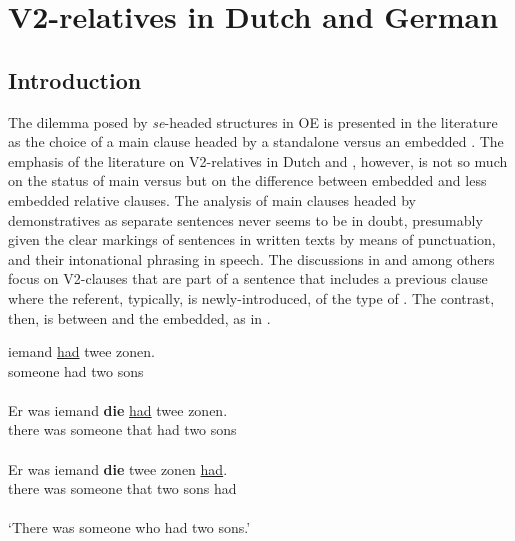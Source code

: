 \documentclass[output=paper,colorlinks,citecolor=brown]{langscibook}
\begin{document}
\section{V2-relatives in Dutch and German}\label{sec:los:3}

\subsection{Introduction}\label{sec:los:3.1}
The dilemma posed by \textit{se}-headed structures in OE is presented in the literature as the choice of a main clause headed by a standalone  versus an embedded . The emphasis of the literature on V2-relatives in Dutch and , however, is not so much on the status of main versus  but on the difference between embedded and less embedded relative clauses. The analysis of main clauses headed by demonstratives as separate sentences never seems to be in doubt, presumably given the clear markings of sentences in written texts by means of punctuation, and their intonational phrasing in speech. The discussions in \citet{Gärtner2001} and \citet{Zwart2003} among others focus on V2-clauses that are part of a sentence that includes a previous clause where the referent, typically, is newly-introduced, of the type of . The contrast, then, is between  and the embedded,   as in . 

 \ea\label{ex:los:15}
 \ea \label{ex:los:15a}
 \glll iemand \underline{had} twee zonen.\\
 someone had two sons\\
[main clause with V2]\\
 
 \ex \label{ex:los:15b}
 \glll Er was iemand \textbf{die} \underline{had} twee zonen. \\
there was someone that had two sons\\
[main clause + V2-relative]\\

 \ex \label{ex:los:15c}
\glll Er was iemand \textbf{die} twee zonen \underline{had}.\\
there was someone that two sons had\\
[main clause + embedded relative] \\
\glt ‘There was someone who had two sons.'
\z
\z
\end{document}
